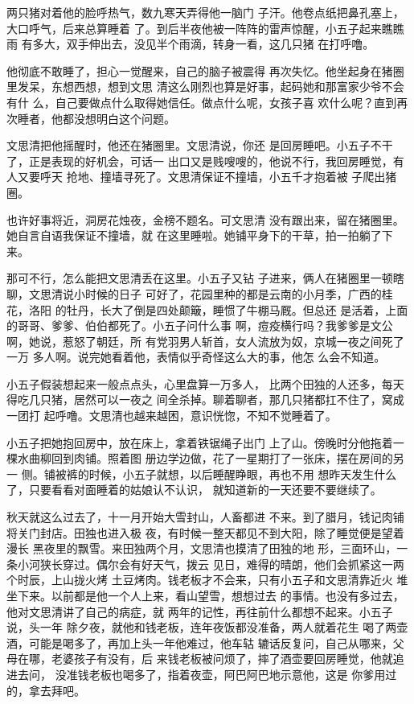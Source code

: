 两只猪对着他的脸呼热气，数九寒天弄得他一脑门
子汗。他卷点纸把鼻孔塞上，大口呼气，后来总算睡着
了。到后半夜他被一阵阵的雷声惊醒，小五子起来瞧瞧雨
有多大，双手伸出去，没见半个雨滴，转身一看，这几只猪
在打呼噜。

他彻底不敢睡了，担心一觉醒来，自己的脑子被震得
再次失忆。他坐起身在猪圈里发呆，东想西想，想到文思
清这么刚烈也算是好事，起码她和那富家少爷不会有什
么，自己要做点什么取得她信任。做点什么呢，女孩子喜
欢什么呢？直到再次睡者，他都没想明白这个问题。

文思清把他摇醒时，他还在猪圈里。文思清说，你还
是回房睡吧。小五子不干了，正是表现的好机会，可话一
出口又是贱嗖嗖的，他说不行，我回房睡觉，有人又要呼天
抢地、撞墙寻死了。文思清保证不撞墙，小五千才抱着被
子爬出猪圈。

也许好事将近，洞房花烛夜，金榜不题名。可文思清
没有跟出来，留在猪圈里。她自言自语我保证不撞墙，就
在这里睡啦。她铺平身下的干草，拍一拍躺了下来。

那可不行，怎么能把文思清丢在这里。小五子又钻
子进来，俩人在猪圈里一顿瞎聊，文思清说小时候的日子
可好了，花园里种的都是云南的小月季，广西的桂花，洛阳
的牡丹，长大了倒是四处颠簸，睡惯了牛棚马厩。但总还
是活着，上面的哥哥、爹爹、伯伯都死了。小五子问什么事
啊，痘疫横行吗？我爹爹是文公啊，她说，惹怒了朝廷，所
有党羽男人斩首，女人流放为奴，京城一夜之间死了一万
多人啊。说完她看着他，表情似乎奇怪这么大的事，他怎
么会不知道。

小五子假装想起来一般点点头，心里盘算一万多人，
比两个田独的人还多，每天得吃几只猪，居然可以一夜之
间全杀掉。聊着聊者，那几只猪都扛不住了，窝成一团打
起呼噜。文思清也越来越困，意识恍惚，不知不觉睡着了。

小五子把她抱回房中，放在床上，拿着铁锯绳子出门
上了山。傍晚时分他拖着一棵水曲柳回到肉铺。照着图
册边学边做，花了一星期打了一张床，摆在房间的另一
侧。铺被裤的时候，小五子就想，以后睡醒睁眼，再也不用
想昨天发生什么了，只要看看对面睡着的姑娘认不认识，
就知道新的一天还要不要继续了。
\newline

秋天就这么过去了，十一月开始大雪封山，人畜都进
不来。到了腊月，钱记肉铺将关门封店。田独也进入极
夜，有时候一整天都见不到大阳，除了睡觉便是望着漫长
黑夜里的飘雪。来田独两个月，文思清也摸清了田独的地
形，三面环山，一条小河狭长穿过。偶尔会有好天气，拨云
见日，难得的晴朗，他们会抓紧这一两个时辰，上山拢火烤
土豆烤肉。钱老板才不会来，只有小五子和文思清靠近火
堆坐下来。以前都是他一个人上来，看山望雪，想想过去
的事情。也没有多过去，他对文思清讲了自己的病症，就
两年的记性，再往前什么都想不起来。小五子说，头一年
除夕夜，就他和钱老板，连年夜饭都没准备，两人就着花生
喝了两壶酒，可能是喝多了，再加上头一年他难过，他车轱
辘话反复问，自己从哪来，父母在哪，老婆孩子有没有，后
来钱老板被问烦了，摔了酒壶要回房睡觉，他就追进去问，
没准钱老板也喝多了，指着夜壶，阿巴阿巴地示意他，这是
你爹用过的，拿去拜吧。

